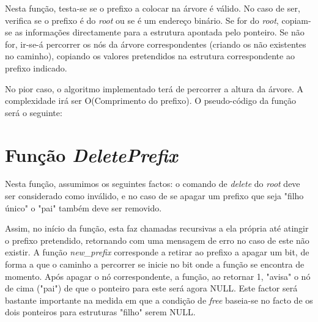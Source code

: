\documentclass[twocolumn]{article}
\begin{document}
Nesta função, testa-se se o prefixo a colocar na árvore é válido. No caso de ser, verifica se o prefixo é do \textit{root} ou se é um endereço binário. Se for do \textit{root}, copiam-se as informações directamente para a estrutura apontada pelo ponteiro. Se não for, ir-se-á percorrer os nós da árvore correspondentes (criando os não existentes no caminho), copiando os valores pretendidos na estrutura correspondente ao prefixo indicado.

No pior caso, o algoritmo implementado terá de percorrer a altura da árvore. A complexidade irá ser O(Comprimento do prefixo).
O pseudo-código da função será o seguinte:
\begin{algorithmic}
 \If{$adress\_is\_invalid$}{
 	\Return\;
 \EndIf
 \If{$adress\_is\_"*"$}{\Comment{root prefix}
 	\State $root->next\_hop:=next\_hop\;$
 	
 	\State $root->prefix:=prefix\;$
 \Else
    \State $auxiliar\_node:=root\_node\;$
 	\While{$all\_prefix\_nodes\_havent\_been\_visited\_yet$}{
 		\If{$bit\_is\_0$}{
 			\If{$there\_is\_no\_node$}
 				\State $node\_creation()\;$
 			\EndIf
 			\State $auxiliar:=auxiliar->zero\;$
 		\Else \Comment{bit is one} 			
 			\If{$there\_is\_no\_node$}
 				\State $node\_creation()\;$
 			\EndIf
 			\State $auxiliar:=auxiliar->one\;$
 		\EndIf
		\State $auxiliar->next\_hop:=next\_hop\;$ 	
 	\EndWhile
 \EndIf
 \caption{AddPrefix}
\end{algorithmic}

\section{Função \textit{DeletePrefix}}
Nesta função, assumimos os seguintes factos: o comando de \textit{delete} do \textit{root} deve ser considerado como inválido, e no caso de se apagar um prefixo que seja "filho único" o "pai" também deve ser removido.

Assim, no início da função, esta faz chamadas recursivas a ela própria até atingir o prefixo pretendido, retornando com uma mensagem de erro no caso de este não existir.
 A função \textit{new\_prefix} corresponde a retirar ao prefixo a apagar um bit, de forma a que o caminho a percorrer se inicie no bit onde a função se encontra de momento. %
Após apagar o nó correspondente, a função, ao retornar 1, "avisa" o nó de cima ("pai") de que o ponteiro para este será agora NULL. Este factor será bastante importante na medida em que a condição de \textit{free} baseia-se no facto de os dois ponteiros para estruturas "filho" serem NULL.
\end{document}
